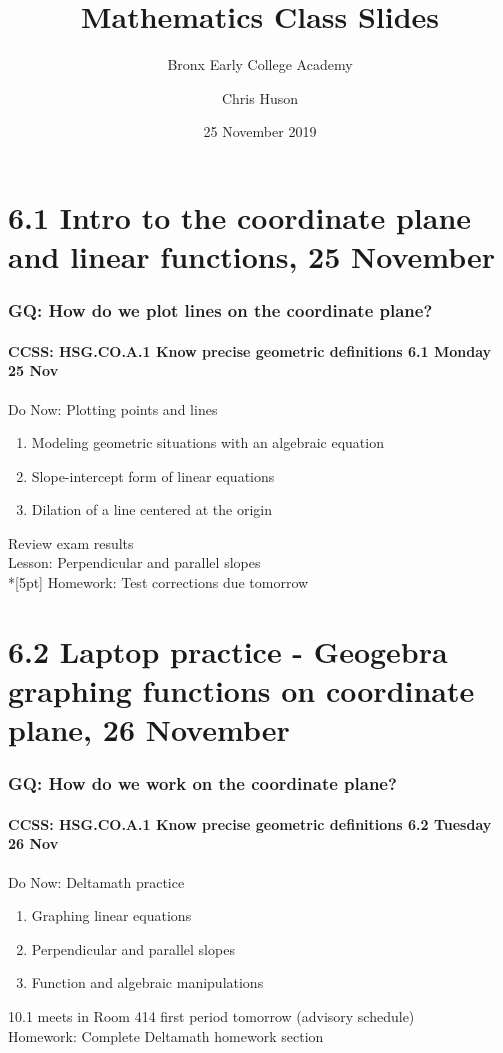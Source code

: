 \documentclass{beamer}
\title{Mathematics Class Slides}
\subtitle{Bronx Early College Academy}
\author{Chris Huson}
\date{25 November 2019}
\begin{document}
\frame{\titlepage}
\section[Outline]{}
\frame{\tableofcontents}

\section{6.1 Intro to the coordinate plane and linear functions, 25 November}
  \frame
  {
    \frametitle{GQ: How do we plot lines on the coordinate plane?}
    \framesubtitle{CCSS: HSG.CO.A.1 Know precise geometric definitions \hfill \alert{6.1 Monday 25 Nov}}

    \begin{block}{Do Now: Plotting points and lines}
    \begin{enumerate}
      \item Modeling geometric situations with an algebraic equation
      \item Slope-intercept form of linear equations
      \item Dilation of a line centered at the origin
    \end{enumerate}
    \end{block}
    Review exam results \\
    Lesson: Perpendicular and parallel slopes \\*[5pt]
    Homework: Test corrections due \alert{tomorrow}
  }

\section{6.2 Laptop practice - Geogebra graphing functions on coordinate plane, 26 November}
\frame
{
\frametitle{GQ: How do we work on the coordinate plane?}
\framesubtitle{CCSS: HSG.CO.A.1 Know precise geometric definitions \hfill \alert{6.2 Tuesday 26 Nov}}

\begin{block}{Do Now: Deltamath practice}
\begin{enumerate}
  \item Graphing linear equations
  \item Perpendicular and parallel slopes
  \item Function and algebraic manipulations
\end{enumerate}
\end{block}
10.1 meets in Room 414 first period tomorrow (advisory schedule)\\[0.5cm]
Homework: Complete Deltamath homework section
}
\end{document}
